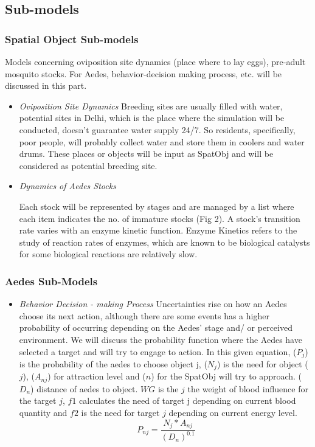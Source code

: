 \subsection{Sub-models}
    \subsubsection{Spatial Object Sub-models}
    
    \indent Models concerning oviposition site dynamics (place where to lay eggs), pre-adult mosquito stocks. For Aedes, behavior-decision making process, etc. will be discussed in this part.
    
    \begin{itemize}
        \item \textit{Oviposition Site Dynamics}
			Breeding sites are usually filled with water, potential sites in Delhi, which is the place where the simulation will be conducted, doesn’t guarantee water supply 24/7. So residents, specifically, poor people, will probably collect water and store them in coolers and water drums. These places or objects will be input as SpatObj and will be considered as potential breeding site.
		
        \item \textit{Dynamics of Aedes Stocks}
        
        Each stock will be represented by stages and are managed by a list where each item indicates the no. of immature stocks (Fig 2). A stock's transition rate varies with an enzyme kinetic function. Enzyme Kinetics refers to the study of reaction rates of enzymes, which are known to be biological catalysts for some biological reactions are relatively slow.\cite{enzyme}
    \end{itemize}
    \subsubsection{Aedes Sub-Models}
    \begin{itemize}
        \item \textit{Behavior Decision - making Process}
        Uncertainties rise on how an Aedes choose its next action, although there are some events has a higher probability of occurring depending on the Aedes’ stage and/ or perceived environment. We will discuss the probability function where the Aedes have selected a target and will try to engage to action. In this given equation, ($P_{j}$) is the probability of the aedes to choose object j, ($N_j$) is the need for object ($j$), ($A_{nj}$) for attraction level and ($n$) for the SpatObj will try to approach. ($D_{n}$) distance of aedes to object.
        $WG$ is the $j$ the weight of blood influence for the target $j$, $f1$ calculates the need of target j depending on current blood quantity and $f2$ is the need for target $j$ depending on current energy level. 
          \begin{equation}\
        P_{nj} = \frac{N_j * A_{nj}}{(D_n)^{0.1}}
    \end{equation}
    \end{itemize} 

